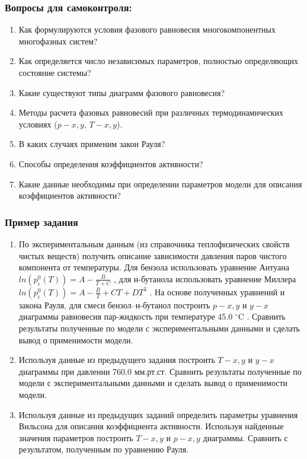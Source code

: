 \subsubsection*{Вопросы для самоконтроля:}
\begin{enumerate}
	\item Как формулируются условия фазового равновесия многокомпонентных многофазных систем?
	\item Как определяется число независимых параметров, полностью определяющих состояние системы?
	\item Какие существуют типы диаграмм фазового равновесия?
	\item Методы расчета фазовых равновесий при различных термодинамических условиях ($p-x,y$,  $T-x,y$).
	\item В каких случаях применим закон Рауля?
	\item Способы определения коэффициентов активности?
	\item Какие данные необходимы при определении параметров модели для описания коэффициентов активности?
\end{enumerate}

\subsubsection*{Пример задания}
\begin{enumerate}
	\item По экспериментальным данным (из справочника теплофизических свойств чистых веществ) получить описание зависимости давления паров чистого компонента от температуры. Для бензола использовать уравнение Антуана $ln(p_i^0(T))=A-\frac{B}{T+C}$         , для н-бутанола использовать уравнение Миллера $ln(p_i^0(T))=A-\frac{B}{T}+C T+DT^3$  . На основе полученных уравнений и закона Рауля, для смеси бензол--н-бутанол построить $p-x,y$ и $y-x$ диаграммы равновесия пар-жидкость при температуре   45.0 $^\circ$C . Сравнить результаты полученные по модели с экспериментальными данными и сделать вывод о применимости модели.
	
	\item Используя данные из предыдущего задания построить $T-x,y$ и $y-x$ диаграммы при давлении  760.0 мм.рт.ст. Сравнить результаты полученные по модели с экспериментальными данными \cite{kogan1,kogan2} и сделать вывод о применимости модели. 
	
	\item Используя данные из предыдущих заданий определить параметры уравнения Вильсона для описания коэффициента активности. Используя найденные значения параметров построить $T-x,y$ и $p-x,y$ диаграммы. Сравнить с результатом, полученным по уравнению Рауля.\end{enumerate}
